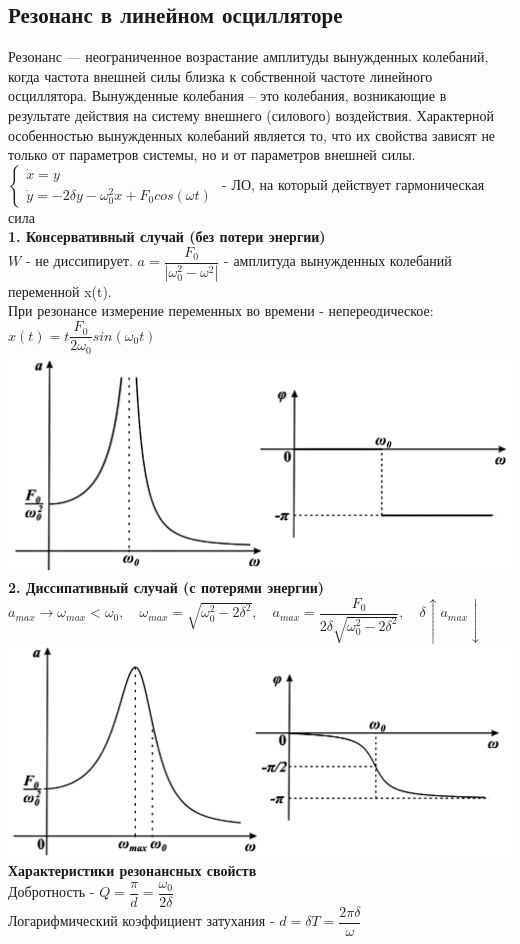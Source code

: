 \begin{multicols*}{2}
		\section{Резонанс в линейном осцилляторе}
		Резонанс — неограниченное возрастание амплитуды вынужденных колебаний, когда частота внешней силы близка к собственной частоте линейного осциллятора. Вынужденные колебания – это колебания, возникающие в результате действия на систему  внешнего (силового) воздействия. Характерной особенностью вынужденных  колебаний является то, что их свойства зависят не только от параметров системы, но и от параметров внешней силы.\\
		$\begin{cases}
			\dot{x} = y \\
			\dot{y} = -2\delta y-\omega_0^2 x + F_0 cos(\omega t)
		\end{cases} $ - ЛО, на который действует гармоническая сила\\
		\textbf{1. Консервативный случай (без потери энергии)}\\
		$W$ - не диссипирует. $a = \dfrac{F_0}{\left\lvert \omega_0^2 - \omega^2\right\rvert }$ - амплитуда вынужденных колебаний переменной x(t).\\
		При резонансе измерение переменных во времени - непереодическое: $x(t) = t\dfrac{F_0}{2\omega_0}sin(\omega_0 t)$\\
		\includegraphics[width=0.6\linewidth]{tk_img/rezonans_1.png}\\
		\textbf{2. Диссипативный случай (с потерями энергии)}\\
		$a_{max}\to \omega_{max}<\omega_0, \quad \omega_{max} = \sqrt{\omega_0^2 - 2\delta^2}, \quad a_{max} = \dfrac{F_0}{2\delta \sqrt{\omega_0^2 - 2\delta^2}}, \quad \delta \uparrow a_{max} \downarrow $\\
		\includegraphics[width=0.6\linewidth]{tk_img/rezonans_2.png}\\
		\textbf{Характеристики резонансных свойств}\\
		Добротность - $Q = \dfrac{\pi}{d} = \dfrac{\omega_0}{2\delta}$\\
		Логарифмический коэффициент затухания - $d = \delta T = \dfrac{2\pi \delta }{\omega}$
		

\end{multicols*}
